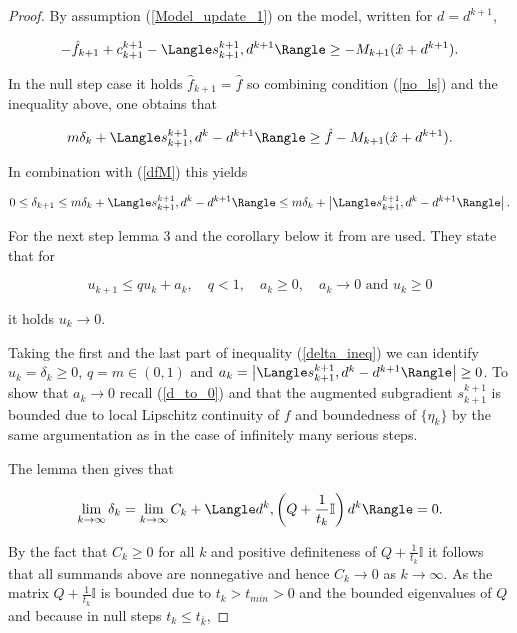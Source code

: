 \begin{proof}
By assumption (\ref{Model_update_1}) on the model, written for \(d=d^{k+1}\),

\begin{equation*}
	-\hat{f}_{k+1}+c^{k+1}_{k+1}-\Langle s^{k+1}_{k+1},d^{k+1}\Rangle \geq -M_{k+1}(\hat{x}+d^{k+1}).
\end{equation*}

In the null step case it holds \(\hat{f}_{k+1}=\hat{f}\) so combining condition (\ref{no_ls}) and the inequality above, one obtains that

\begin{equation*}
	m\delta_k+\Langle s^{k+1}_{k+1},d^k-d^{k+1}\Rangle \geq \hat{f}-M_{k+1}(\hat{x}+d^{k+1}).
\end{equation*}

In combination with (\ref{dfM}) this yields

\begin{equation}
	0 \leq \delta_{k+1} \leq m\delta_k + \Langle s^{k+1}_{k+1},d^k-d^{k+1}\Rangle \leq m\delta_k + \left\vert \Langle s^{k+1}_{k+1},d^k-d^{k+1}\Rangle\right\vert.
	\label{delta_ineq}
\end{equation}

For the next step lemma 3 and the corollary below it from \cite[p. 45]{Polyak1987} are used. They state that for

 \begin{equation*}
	u_{k+1} \leq qu_k + a_k, \quad q < 1, \quad a_k \geq 0, \quad a_k \to 0 \text{ and } u_k \geq 0
\end{equation*}

it holds \(u_k \to 0 \).



Taking the first and the last part of inequality (\ref{delta_ineq}) we can identify \(u_k = \delta_k \geq 0\), \(q = m \in (0,1)\) and \(a_k = \left\vert\Langle s^{k+1}_{k+1},d^k-d^{k+1}\Rangle\right\vert \geq 0\). To show that \(a_k \to 0\) recall (\ref{d_to_0}) and that the augmented subgradient \(s^{k+1}_{k+1}\) is bounded due to local Lipschitz continuity of \(f\) and boundedness of \(\{\eta_k\}\) by the same argumentation as in the case of infinitely many serious steps.

The lemma then gives that

\begin{equation*}
	\lim_{k \to \infty} \delta_k = \lim_{k \to \infty} C_k + \Langle d^k,\left(Q+\frac{1}{t_k}\mathbb{I}\right)d^k\Rangle = 0.
\end{equation*}

By the fact that \(C_k \geq 0\) for all \(k\) and positive definiteness of \(Q+\frac{1}{t_k}\mathbb{I} \)  it follows that all summands above are nonnegative and hence \(C_k \to 0\) as \(k \to \infty\). As the matrix \(Q+\frac{1}{t_k}\mathbb{I}\) is bounded due to \(t_k > t_{min} > 0\) and the bounded eigenvalues of \(Q\) and because in null steps \(t_k \leq t_{\bar{k}}\),


\end{proof}
